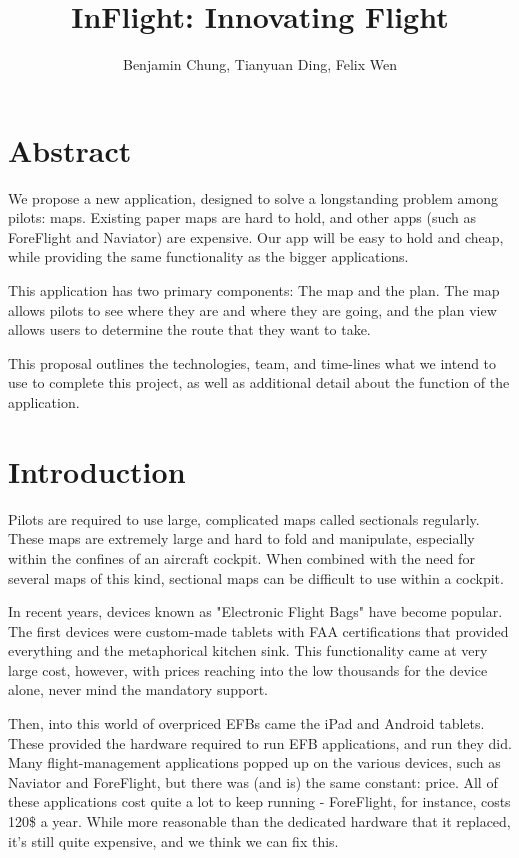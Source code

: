 \documentclass[10pt,a4paper]{article}
\author{Benjamin Chung, Tianyuan Ding, Felix Wen}
\title{InFlight: Innovating Flight}
\begin{document}
\maketitle
\section*{Abstract}
We propose a new application, designed to solve a longstanding problem among pilots: maps. Existing paper maps are hard to hold, and other apps (such as ForeFlight and Naviator) are expensive. Our app will be easy to hold and cheap, while providing the same functionality as the bigger applications.

This application has two primary components: The map and the plan. The map allows pilots to see where they are and where they are going, and the plan view allows users to determine the route that they want to take.

This proposal outlines the technologies, team, and time-lines what we intend to use to complete this project, as well as additional detail about the function of the application.
\tableofcontents

\new
\section{Introduction}
Pilots are required to use large, complicated maps called sectionals regularly. These maps are extremely large and hard to fold and manipulate, especially within the confines of an aircraft cockpit. When combined with the need for several maps of this kind, sectional maps can be difficult to use within a cockpit.

In recent years, devices known as "Electronic Flight Bags" have become popular. The first devices were custom-made tablets with FAA certifications that provided everything and the metaphorical kitchen sink. This functionality came at very large cost, however, with prices reaching into the low thousands for the device alone, never mind the mandatory support.

Then, into this world of overpriced EFBs came the iPad and Android tablets. These provided the hardware required to run EFB applications, and run they did. Many flight-management applications popped up on the various devices, such as Naviator and ForeFlight, but there was (and is) the same constant: price. All of these applications cost quite a lot to keep running - ForeFlight, for instance, costs 120\$ a year. While more reasonable than the dedicated hardware that it replaced, it's still quite expensive, and we think we can fix this.
\end{document}
